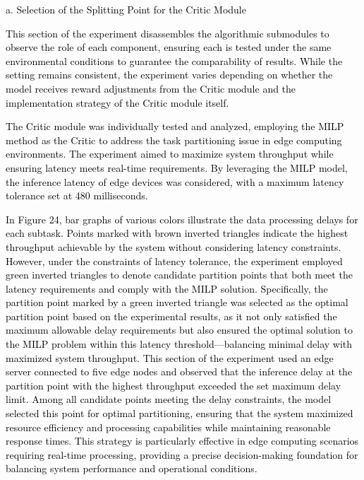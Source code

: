\documentclass[preprint,12pt]{elsarticle}
\begin{document}
\textcolor{black}{a.	Selection of the Splitting Point for the Critic Module}

\textcolor{black}{This section of the experiment disassembles the algorithmic submodules to observe the role of each component, ensuring each is tested under the same environmental conditions to guarantee the comparability of results. While the setting remains consistent, the experiment varies depending on whether the model receives reward adjustments from the Critic module and the implementation strategy of the Critic module itself.}

\textcolor{black}{The Critic module was individually tested and analyzed, employing the MILP method as the Critic to address the task partitioning issue in edge computing environments. The experiment aimed to maximize system throughput while ensuring latency meets real-time requirements. By leveraging the MILP model, the inference latency of edge devices was considered, with a maximum latency tolerance set at 480 milliseconds.}

\textcolor{black}{In Figure 24, bar graphs of various colors illustrate the data processing delays for each subtask. Points marked with brown inverted triangles indicate the highest throughput achievable by the system without considering latency constraints. However, under the constraints of latency tolerance, the experiment employed green inverted triangles to denote candidate partition points that both meet the latency requirements and comply with the MILP solution. Specifically, the partition point marked by a green inverted triangle was selected as the optimal partition point based on the experimental results, as it not only satisfied the maximum allowable delay requirements but also ensured the optimal solution to the MILP problem within this latency threshold—balancing minimal delay with maximized system throughput. This section of the experiment used an edge server connected to five edge nodes and observed that the inference delay at the partition point with the highest throughput exceeded the set maximum delay limit. Among all candidate points meeting the delay constraints, the model selected this point for optimal partitioning, ensuring that the system maximized resource efficiency and processing capabilities while maintaining reasonable response times. This strategy is particularly effective in edge computing scenarios requiring real-time processing, providing a precise decision-making foundation for balancing system performance and operational conditions.}
\end{document}
